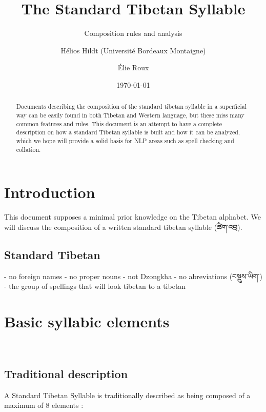 \documentclass[%
a4paper,%
pagesize,%
12pt,%
parskip=off,%
bibliography=totoc,%
numbers=noenddot,%
DIV=12,%
twoside=semi,%
headings=normal%
]{scrartcl}
\title{The Standard Tibetan Syllable}
\subtitle{Composition rules and analysis}
\author{Hélios Hildt (Université Bordeaux Montaigne) \and Élie Roux}
\date{\today}
\begin{document}
\maketitle

\begin{abstract}
Documents describing the composition of the standard tibetan syllable in a superficial way can be easily found in both Tibetan and Western language, but these miss many common features and rules. This document is an attempt to have a complete description on how a standard Tibetan syllable is built and how it can be analyzed, which we hope will provide a solid basis for NLP areas such as spell checking and collation.
\end{abstract}


\tableofcontents

\newpage

\section{Introduction}

This document supposes a minimal prior knowledge on the Tibetan alphabet. We will discuss the composition of a written standard tibetan syllable (ཚིག་འབྲ).

\subsection{Standard Tibetan}

- no foreign names
- no proper nouns
- not Dzongkha
- no abreviations (བསྡུས་ཡིག་)
- the group of spellings that will look tibetan to a tibetan

\section{Basic syllabic elements}

­\subsection{Traditional description}

A Standard Tibetan Syllable is traditionally described as being composed of a maximum of 8 elements :
\end{document}
